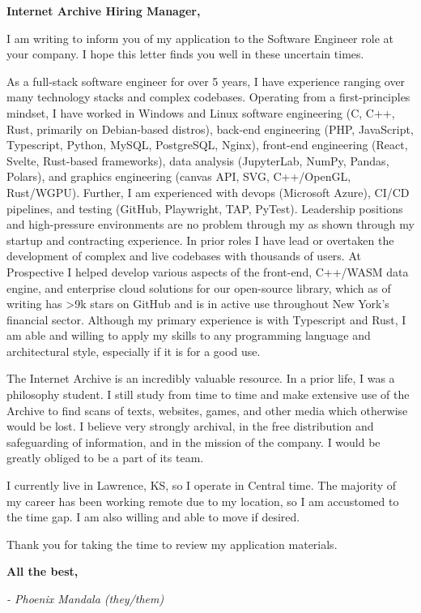 \documentclass[10pt, letterpaper]{article}
\begin{document}
	\begin{doublespace}
		\noindent
		\textbf{Internet Archive Hiring Manager,}

		I am writing to inform you of my application to the Software Engineer role at
		your company. I hope this letter finds you well in these uncertain times.

		As a full-stack software engineer for over 5 years, I have experience ranging
		over many technology stacks and complex codebases. Operating from a first-principles
		mindset, I have worked in Windows and Linux software engineering (C, C++,
		Rust, primarily on Debian-based distros), back-end engineering (PHP, JavaScript,
		Typescript, Python, MySQL, PostgreSQL, Nginx), front-end engineering (React,
		Svelte, Rust-based frameworks), data analysis (JupyterLab, NumPy, Pandas, Polars),
		and graphics engineering (canvas API, SVG, C++/OpenGL, Rust/WGPU). Further,
		I am experienced with devops (Microsoft Azure), CI/CD pipelines, and testing
		(GitHub, Playwright, TAP, PyTest). Leadership positions and high-pressure
		environments are no problem through my as shown through my startup and
		contracting experience. In prior roles I have lead or overtaken the development
		of complex and live codebases with thousands of users. At Prospective I
		helped develop various aspects of the front-end, C++/WASM data engine, and
		enterprise cloud solutions for our open-source library, which as of writing has
		>9k stars on GitHub and is in active use throughout New York's financial
		sector. Although my primary experience is with Typescript and Rust, I am
		able and willing to apply my skills to any programming language and
		architectural style, especially if it is for a good use.

		The Internet Archive is an incredibly valuable resource. In a prior life, I was
		a philosophy student. I still study from time to time and make extensive use
		of the Archive to find scans of texts, websites, games, and other media which
		otherwise would be lost. I believe very strongly archival, in the free distribution
		and safeguarding of information, and in the mission of the company. I would be
		greatly obliged to be a part of its team.

		I currently live in Lawrence, KS, so I operate in Central time. The majority
		of my career has been working remote due to my location, so I am accustomed to
		the time gap. I am also willing and able to move if desired.

		Thank you for taking the time to review my application materials.

		\noindent
		\textbf{All the best,}

		\noindent
		\textit{- Phoenix Mandala (they/them)}
	\end{doublespace}
\end{document}
